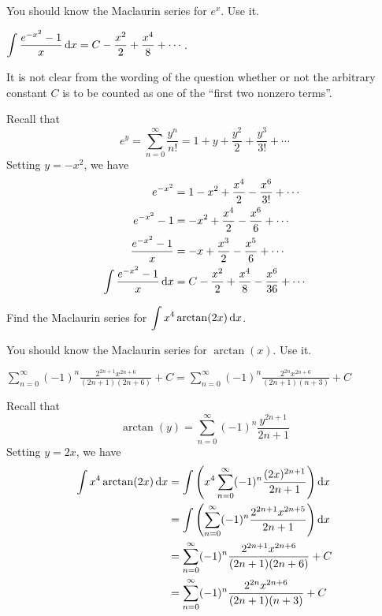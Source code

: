 \begin{hint}
You should know the Maclaurin series for $e^x$. Use it.
\end{hint}

\begin{answer}
$\displaystyle\int \frac{e^{-x^2}-1}{x} \,\mathrm{d}x = C -\frac{x^2}{2} + \frac{x^4}{8} + \cdots$.


It is not clear from the wording of the question whether or not
the arbitrary constant $C$ is to be counted as one of the
``first two nonzero terms''.
\end{answer}

\begin{solution}
Recall that
\begin{equation*}
e^y = \sum_{n=0}^\infty\frac{y^n}{n!}
    =1 + y + \frac{y^2}{2} +\frac{y^3}{3!} + \cdots
\end{equation*}
Setting $y=-x^2$, we have
\begin{align*}
e^{-x^2} & = 1 -x^2 + \frac{x^4}{2} - \frac{x^6}{3!} + \cdots \\
e^{-x^2} - 1& =  -x^2 + \frac{x^4}{2} - \frac{x^6}{6} + \cdots \\
\frac{e^{-x^2} - 1}{x}& =  -x + \frac{x^3}{2} - \frac{x^5}{6} + \cdots \\
\int \frac{e^{-x^2}-1}{x} \,\mathrm{d}x& = C -\frac{x^2}{2} + \frac{x^4}{8} - \frac{x^6}{36} + \cdots \\
\end{align*}
\end{solution}




\begin{question}[2015A]
Find the Maclaurin series for $\displaystyle{\int x^4\arctan(2x) \,\mathrm{d}x}$.
\end{question}

\begin{hint}
You should know the Maclaurin series for $\arctan(x)$. Use it.
\end{hint}

\begin{answer}
$\displaystyle\sum\limits_{n=0}^\infty (-1)^n\frac{2^{2n+1} x^{2n+6}}{(2n+1)(2n+6)} +C
=\sum\limits_{n=0}^\infty (-1)^n\frac{2^{2n} x^{2n+6}}{(2n+1)(n+3)} +C$
\end{answer}

\begin{solution}
Recall that
\begin{equation*}
\arctan(y) = \sum_{n=0}^\infty(-1)^n\frac{y^{2n+1}}{2n+1}
\end{equation*}
Setting $y=2x$, we have
\begin{align*}
\int x^4\arctan(2x) \,\mathrm{d}x&=
\int\left( x^4\sum_{n=0}^\infty (-1)^n\frac{(2x)^{2n+1}}{2n+1} \right)\mathrm{d}x
\\&=
\int\left( \sum_{n=0}^\infty (-1)^n\frac{2^{2n+1}x^{2n+5}}{2n+1} \right)\mathrm{d}x
\\
&=
\sum_{n=0}^\infty (-1)^n\frac{2^{2n+1} x^{2n+6}}{(2n+1)(2n+6)} +C\\
&=\sum_{n=0}^\infty (-1)^n\frac{2^{2n} x^{2n+6}}{(2n+1)(n+3)} +C
\end{align*}
\end{solution}


